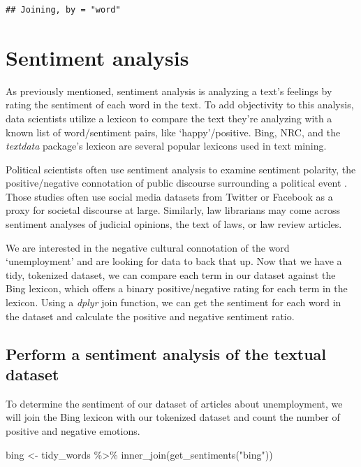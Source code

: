 \documentclass[
  krantz2]{krantz}
\makeatletter
\newenvironment{Shaded}{\begin{snugshade}}{\end{snugshade}}
\newcommand{\FunctionTok}[1]{\textcolor[rgb]{0,0,0}{#1}}
\newcommand{\NormalTok}[1]{#1}
\newcommand{\OtherTok}[1]{\textcolor[rgb]{0.37,0.37,0.37}{#1}}
\newcommand{\SpecialCharTok}[1]{\textcolor[rgb]{0,0,0}{#1}}
\newcommand{\StringTok}[1]{\textcolor[rgb]{0.5,0.5,0.5}{#1}}
\newenvironment{kframe}{%
\medskip{}
\setlength{\fboxsep}{.8em}
 \def\at@end@of@kframe{}%
 \ifinner\ifhmode%
  \def\at@end@of@kframe{\end{minipage}}%
  \begin{minipage}{\columnwidth}%
 \fi\fi%
 \def\FrameCommand##1{\hskip\@totalleftmargin \hskip-\fboxsep
 \colorbox{shadecolor}{##1}\hskip-\fboxsep
     \hskip-\linewidth \hskip-\@totalleftmargin \hskip\columnwidth}%
 \MakeFramed {\advance\hsize-\width
   \@totalleftmargin\z@ \linewidth\hsize
   \@setminipage}}%
 {\par\unskip\endMakeFramed%
 \at@end@of@kframe}
\renewenvironment{Shaded}{\begin{kframe}}{\end{kframe}}
\makeatother
\begin{document}
\begin{verbatim}
## Joining, by = "word"
\end{verbatim}

\hypertarget{sentiment-analysis}{%
\section{Sentiment analysis}\label{sentiment-analysis}}

As previously mentioned, sentiment analysis is analyzing a text's feelings by rating the sentiment of each word in the text. To add objectivity to this analysis, data scientists utilize a lexicon to compare the text they're analyzing with a known list of word/sentiment pairs, like `happy'/positive. Bing, NRC, and the \emph{textdata} package's lexicon\citep{mohammad13} are several popular lexicons used in text mining.

Political scientists often use sentiment analysis to examine sentiment polarity, the positive/negative connotation of public discourse surrounding a political event \citep{matalon21}. Those studies often use social media datasets from Twitter or Facebook as a proxy for societal discourse at large. Similarly, law librarians may come across sentiment analyses of judicial opinions, the text of laws, or law review articles.

We are interested in the negative cultural connotation of the word `unemployment' and are looking for data to back that up. Now that we have a tidy, tokenized dataset, we can compare each term in our dataset against the Bing lexicon, which offers a binary positive/negative rating for each term in the lexicon. Using a \emph{dplyr} join function, we can get the sentiment for each word in the dataset and calculate the positive and negative sentiment ratio.

\hypertarget{bing-load}{%
\subsection{Perform a sentiment analysis of the textual dataset}\label{bing-load}}

To determine the sentiment of our dataset of articles about unemployment, we will join the Bing lexicon\citep{Hu04} with our tokenized dataset and count the number of positive and negative emotions.

\begin{Shaded}
\begin{Highlighting}[]
\NormalTok{bing }\OtherTok{\textless{}{-}}\NormalTok{ tidy\_words }\SpecialCharTok{\%\textgreater{}\%}
  \FunctionTok{inner\_join}\NormalTok{(}\FunctionTok{get\_sentiments}\NormalTok{(}\StringTok{"bing"}\NormalTok{)) }
\end{Highlighting}
\end{Shaded}
\end{document}

